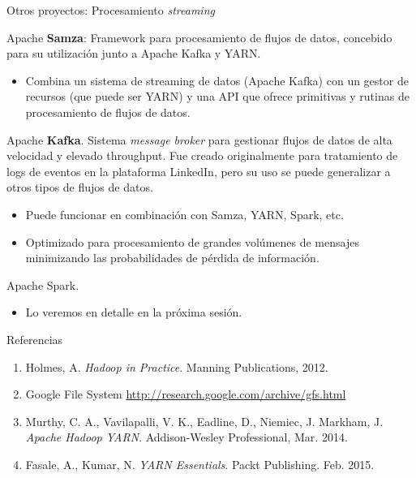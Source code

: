 
\begin{frame}{Otros proyectos: Procesamiento \textit{streaming}}
  \begin{wideitemize}
    \item Apache \textbf{Samza}: Framework para procesamiento de flujos de datos,
     concebido para su utilización junto a Apache Kafka y YARN.
    \begin{itemize}
     \item Combina un sistema de streaming de datos (Apache Kafka) con un gestor
     de recursos (que puede ser YARN) y una API que ofrece primitivas y rutinas
     de procesamiento de flujos de datos.
    \end{itemize}
    
    \item Apache \textbf{Kafka}. Sistema \textit{message broker} para gestionar 
     flujos de datos de alta velocidad y elevado throughput. Fue creado originalmente
     para tratamiento de logs de eventos en la plataforma LinkedIn, pero su uso
     se puede generalizar a otros tipos de flujos de datos.
     \begin{itemize}
     \item Puede funcionar en combinación con Samza, YARN, Spark, etc.
     \item Optimizado para procesamiento de grandes volúmenes de mensajes minimizando
     las probabilidades de pérdida de información.
    \end{itemize}
    
    \item Apache Spark.
    \begin{itemize}
     \item Lo veremos en detalle en la próxima sesión.
    \end{itemize}
      
    \end{wideitemize}

\end{frame}


\begin{frame}{Referencias}
 \begin{enumerate}
  \item Holmes, A. \textit{Hadoop in Practice}. Manning Publications, 2012.
  \item Google File System \url{http://research.google.com/archive/gfs.html}
  \item Murthy, C. A., Vavilapalli, V. K., Eadline, D., Niemiec, J. Markham, J.
  \textit{Apache Hadoop YARN}. Addison-Wesley Professional, Mar. 2014.
  \item Fasale, A., Kumar, N. \textit{YARN Essentials}. Packt Publishing. Feb. 2015. 
 \end{enumerate}

\end{frame}

